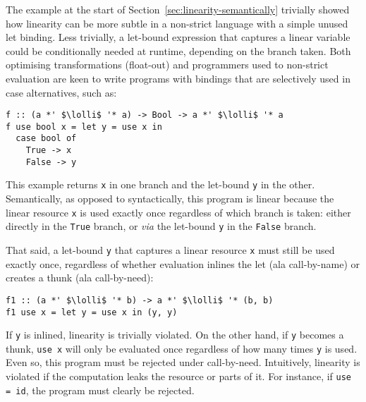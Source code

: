 \documentclass[acmsmall,review,anonymous,screen]{acmart}
\newcommand{\lolli}{\multimap}
\begin{document}
The example at the start of Section~\ref{sec:linearity-semantically}
trivially showed how linearity can be more subtle in a non-strict language with
a simple unused let binding.
%
Less trivially, a let-bound expression that captures a linear variable
could be conditionally needed at runtime, depending on the branch taken.
Both optimising transformations (float-out) and programmers used to
non-strict evaluation are keen to write programs with bindings that are selectively
used in case alternatives, such as:
%
\begin{notyet}
\begin{lstlisting}
f :: (a *' $\lolli$ '* a) -> Bool -> a *' $\lolli$ '* a
f use bool x = let y = use x in
  case bool of
    True -> x 
    False -> y
\end{lstlisting}
\end{notyet}
%
This example returns \lstinline{x} in one branch and the let-bound
\lstinline{y} in the other. Semantically, as opposed to syntactically, this
program is linear %
because the linear resource \lstinline{x} is used exactly once regardless of which branch is
taken: either directly in the \lstinline{True} branch, or \emph{via} the
let-bound \lstinline{y} in the \lstinline{False} branch.

That said, a let-bound \lstinline{y} that captures a linear resource
\lstinline{x} must still be used exactly once, regardless of whether evaluation
inlines the let (ala call-by-name) or creates a thunk (ala call-by-need):
%
%
\begin{noway}
\begin{lstlisting}
f1 :: (a *' $\lolli$ '* b) -> a *' $\lolli$ '* (b, b)
f1 use x = let y = use x in (y, y)
\end{lstlisting}
\end{noway}
%
If \lstinline{y} is inlined, linearity is trivially violated.
%
On the other hand, if \lstinline{y} becomes a thunk, \lstinline{use x} will
only be evaluated once regardless of how many times \lstinline{y} is used.
Even so, this program must be rejected under call-by-need.
%
Intuitively, linearity is violated if the computation leaks the resource or
parts of it. For instance, if \lstinline{use = id}, the program must clearly be
rejected.
%
%
%
\end{document}
